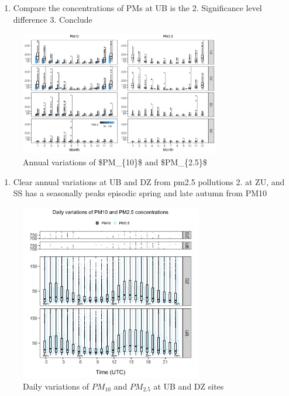 \documentclass[
  11pt,
]{article}
\providecommand{\tightlist}{%
  \setlength{\itemsep}{0pt}\setlength{\parskip}{0pt}}
\begin{document}
\begin{enumerate}
\def\labelenumi{\arabic{enumi}.}
\tightlist
\item
  Compare the concentrations of PMs at UB is the 2. Significance level
  difference 3. Conclude
\end{enumerate}

\newpage

\begin{figure}
\centering
\includegraphics[width=3.4375in,height=\textheight,keepaspectratio]{images/figure_4.png}
\caption{Annual variations of \$PM\_\{10\}\$ and \$PM\_\{2.5\}\$}
\end{figure}

\begin{enumerate}
\def\labelenumi{\arabic{enumi}.}
\tightlist
\item
  Clear annual variations at UB and DZ from pm2.5 pollutions 2. at ZU,
  and SS has a seasonally peaks episodic spring and late autumn from
  PM10
\end{enumerate}

\newpage

\begin{figure}
\centering
\includegraphics[width=3.125in,height=\textheight,keepaspectratio]{images/figure_5.png}
\caption{Daily variations of \(PM_{10}\) and \(PM_{2.5}\) at UB and DZ
sites}
\end{figure}
\end{document}
